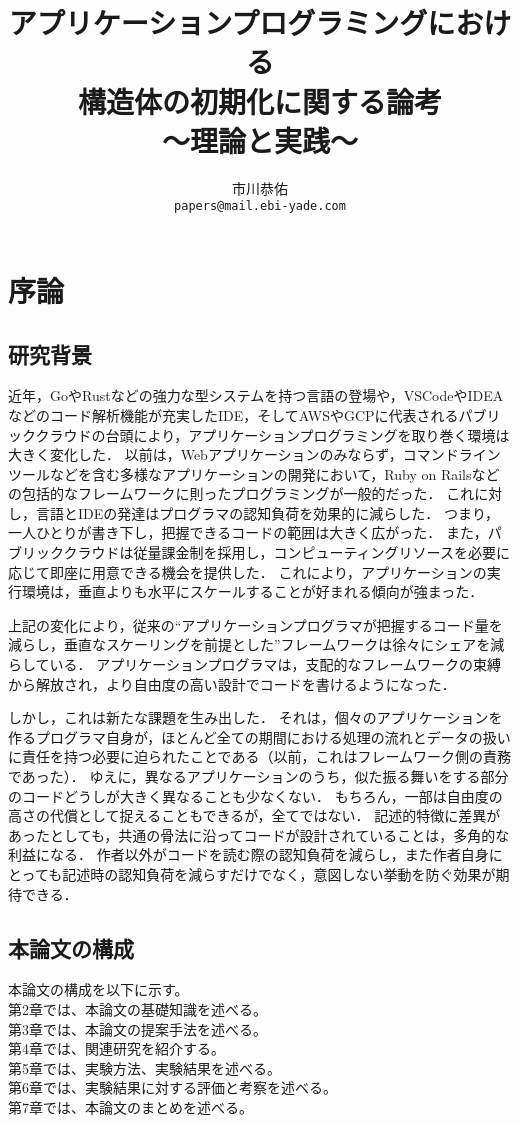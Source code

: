 \documentclass[a4paper,12pt]{jsreport}
\title{
\LARGE{アプリケーションプログラミングにおける\\構造体の初期化に関する論考}\\
\Large{〜理論と実践〜}
}
\author{市川恭佑\\\texttt{papers@mail.ebi-yade.com}}
\date{}
\begin{document}
\maketitle
{}
\tableofcontents
\newpage
\listoffigures
\listoftables
\newpage
{}
\newpage

\chapter{序論}
\section{研究背景}
近年，GoやRustなどの強力な型システムを持つ言語の登場や，VSCodeやIDEAなどのコード解析機能が充実したIDE，そしてAWSやGCPに代表されるパブリッククラウドの台頭により，アプリケーションプログラミングを取り巻く環境は大きく変化した．
以前は，Webアプリケーションのみならず，コマンドラインツールなどを含む多様なアプリケーションの開発において，Ruby on Railsなどの包括的なフレームワークに則ったプログラミングが一般的だった．
これに対し，言語とIDEの発達はプログラマの認知負荷を効果的に減らした．
つまり，一人ひとりが書き下し，把握できるコードの範囲は大きく広がった．
また，パブリッククラウドは従量課金制を採用し，コンピューティングリソースを必要に応じて即座に用意できる機会を提供した．
これにより，アプリケーションの実行環境は，垂直よりも水平にスケールすることが好まれる傾向が強まった．
\par
上記の変化により，従来の``アプリケーションプログラマが把握するコード量を減らし，垂直なスケーリングを前提とした''フレームワークは徐々にシェアを減らしている．
アプリケーションプログラマは，支配的なフレームワークの束縛から解放され，より自由度の高い設計でコードを書けるようになった．
\par
しかし，これは新たな課題を生み出した．
それは，個々のアプリケーションを作るプログラマ自身が，ほとんど全ての期間における処理の流れとデータの扱いに責任を持つ必要に迫られたことである（以前，これはフレームワーク側の責務であった）．
ゆえに，異なるアプリケーションのうち，似た振る舞いをする部分のコードどうしが大きく異なることも少なくない．
もちろん，一部は自由度の高さの代償として捉えることもできるが，全てではない．
記述的特徴に差異があったとしても，共通の骨法に沿ってコードが設計されていることは，多角的な利益になる．
作者以外がコードを読む際の認知負荷を減らし，また作者自身にとっても記述時の認知負荷を減らすだけでなく，意図しない挙動を防ぐ効果が期待できる．

\section{本論文の構成}
本論文の構成を以下に示す。\\
第2章では、本論文の基礎知識を述べる。\\
第3章では、本論文の提案手法を述べる。\\
第4章では、関連研究を紹介する。\\
第5章では、実験方法、実験結果を述べる。\\
第6章では、実験結果に対する評価と考察を述べる。\\
第7章では、本論文のまとめを述べる。
\end{document}
